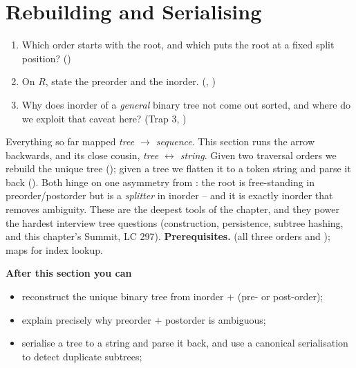 \section{Rebuilding and Serialising}\label{sec:c03-rebuild}

\begin{previouslybox}
\begin{enumerate}[nosep, leftmargin=1.6em]
  \item Which order starts with the root, and which puts the root at a fixed split
        position? ()
  \item On $R$, state the preorder and the inorder. (, )
  \item Why does inorder of a \emph{general} binary tree not come out sorted, and where
        do we exploit that caveat here? (Trap 3, )
\end{enumerate}
\end{previouslybox}

\begin{topicintro}
Everything so far mapped \emph{tree $\to$ sequence}. This section runs the arrow
backwards, and its close cousin, \emph{tree $\leftrightarrow$ string}. Given two traversal
orders we rebuild the unique tree (); given a tree we flatten it to a
token string and parse it back (). Both hinge on one asymmetry from
: the root is free-standing in preorder/postorder but is a
\emph{splitter} in inorder -- and it is exactly inorder that removes ambiguity. These are
the deepest tools of the chapter, and they power the hardest interview tree questions
(construction, persistence, subtree hashing, and this chapter's Summit, LC 297).
\textbf{Prerequisites.}  (all three orders and );
maps for index lookup.

\textbf{After this section you can}
\begin{itemize}[nosep]
  \item reconstruct the unique binary tree from inorder $+$ (pre- or post-order);       \hfill{}
  \item explain precisely why preorder $+$ postorder is ambiguous;                      \hfill{}
  \item serialise a tree to a string and parse it back, and use a canonical serialisation
        to detect duplicate subtrees;                                                   \hfill{}
\end{itemize}
\end{topicintro}

